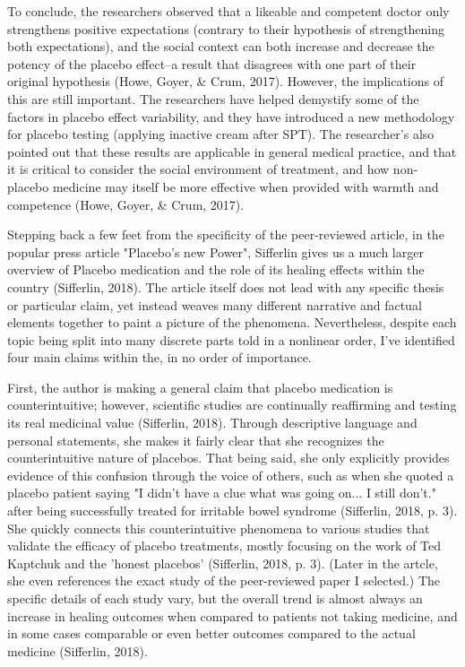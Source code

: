 \documentclass[a4paper, 10pt]{article}
\begin{document}
	To conclude, the researchers observed that a likeable and competent doctor only strengthens positive expectations (contrary to their hypothesis of strengthening both expectations), and the social context can both increase and decrease the potency of the placebo effect--a result that disagrees with one part of their original hypothesis (Howe, Goyer, \& Crum, 2017). However, the implications of this are still important. The researchers have helped demystify some of the factors in placebo effect variability, and they have introduced
 a new methodology for placebo testing (applying inactive cream after SPT). The researcher's also pointed out that these results are applicable in general medical practice, and that it is critical to consider the social environment of treatment, and how non-placebo medicine may itself be more effective when provided with warmth and competence (Howe, Goyer, \& Crum, 2017).

Stepping back a few feet from the specificity of the peer-reviewed article, in the popular press article "Placebo's new Power", Sifferlin gives us a much larger overview of Placebo medication and the role of its healing effects within the country (Sifferlin, 2018). The article itself does not lead with any specific thesis or particular claim, yet instead weaves many different narrative and factual elements together to paint a picture of the phenomena. Nevertheless, despite each topic being split into many discrete
 parts told in a nonlinear order, I've identified four main claims within the, in no order of importance. 

First, the author is making a general claim that placebo medication is  counterintuitive; however, scientific studies are continually reaffirming and testing its real medicinal value (Sifferlin, 2018). Through descriptive language and personal statements, she makes it fairly clear that she recognizes the counterintuitive nature of placebos. That being said, she only explicitly provides evidence of this confusion through the voice of others, such as when she quoted a placebo patient saying "I didn't have a clue what
 was going on... I still don't." after being successfully treated for irritable bowel syndrome (Sifferlin, 2018, p. 3). She quickly connects this counterintuitive phenomena to various studies that validate the efficacy of placebo treatments, mostly focusing on the work of Ted Kaptchuk and the 'honest placebos'  (Sifferlin, 2018, p. 3).  (Later in the artcle, she even references the exact study of the peer-reviewed paper I selected.) The specific details of each study vary, but the overall trend is almost always an increase in healing outcomes
 when compared to patients not taking medicine, and in some cases comparable or even better outcomes compared to the actual medicine  (Sifferlin, 2018). 
\end{document}
